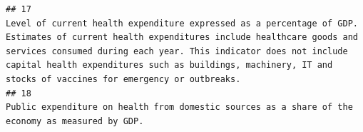 \documentclass[
]{article}
\begin{document}
\begin{verbatim}
## 17                                                                                                                                                                                                                                                                                                                                                                                                                                                                                                                                                                                                                                                                                                                                                                                                                                                                                                                                                                                                                                                                                                                  Level of current health expenditure expressed as a percentage of GDP.  Estimates of current health expenditures include healthcare goods and services consumed during each year. This indicator does not include capital health expenditures such as buildings, machinery, IT and stocks of vaccines for emergency or outbreaks.
## 18                                                                                                                                                                                                                                                                                                                                                                                                                                                                                                                                                                                                                                                                                                                                                                                                                                                                                                                                                                                                                                                                                                                                                                                                                                                                                                                                                  Public expenditure on health from domestic sources as a share of the economy as measured by GDP.

\end{verbatim}
\end{document}
